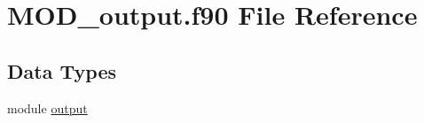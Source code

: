 \hypertarget{MOD__output_8f90}{\section{M\-O\-D\-\_\-output.\-f90 File Reference}
\label{MOD__output_8f90}
}
\subsection*{Data Types}
\begin{DoxyCompactItemize}
\item 
module \hyperlink{classoutput}{output}
\end{DoxyCompactItemize}
